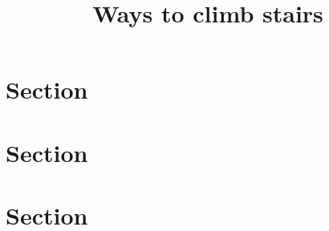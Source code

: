 \documentclass[12pt]{article}
\title{Ways to climb stairs}
\begin{document}
\maketitle
\section{Section}

\section{Section}

\section{Section}
\end{document}
